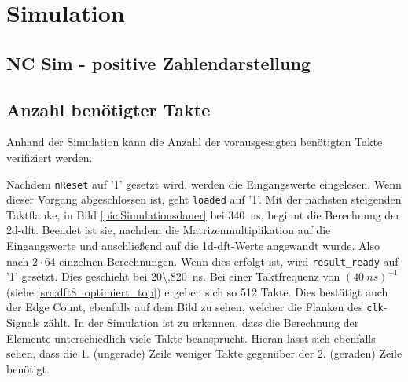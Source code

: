 \section{Simulation}
 \subsection{NC Sim - positive Zahlendarstellung}
 
 \subsection{Anzahl benötigter Takte}
 Anhand der Simulation kann die Anzahl der vorausgesagten benötigten Takte verifiziert werden. 
 
 Nachdem \texttt{nReset} auf '1' gesetzt wird, werden die Eingangswerte
 eingelesen. Wenn dieser Vorgang abgeschlossen ist, geht \texttt{loaded} auf '1'. Mit der nächsten steigenden Taktflanke, in Bild \ref{pic:Simulationsdauer} bei 
 \SI{340}{ns}, beginnt die Berechnung
 der \gls{2d-dft}. Beendet ist sie, nachdem die Matrizenmultiplikation auf die Eingangswerte und anschließend auf die \gls{1d-dft}-Werte angewandt wurde. Also nach $2 \cdot 64$
 einzelnen Berechnungen. Wenn dies erfolgt ist, wird \texttt{result\_ready} auf '1' gesetzt. Dies geschieht bei \SI{20\,820}{ns}. Bei einer Taktfrequenz von $(\SI{40}{ns})^{-1}$
 (siehe \ref{src:dft8_optimiert_top}) ergeben sich so 512 Takte. Dies bestätigt auch der Edge Count, ebenfalls auf dem Bild zu sehen, welcher die Flanken des \texttt{clk}-Signals 
 zählt. In der Simulation ist zu erkennen, dass die Berechnung der Elemente 
 unterschiedlich viele Takte beansprucht. Hieran lässt sich ebenfalls sehen, dass die 1. (ungerade) Zeile weniger Takte gegenüber der 2. (geraden) Zeile benötigt. 
 
 
